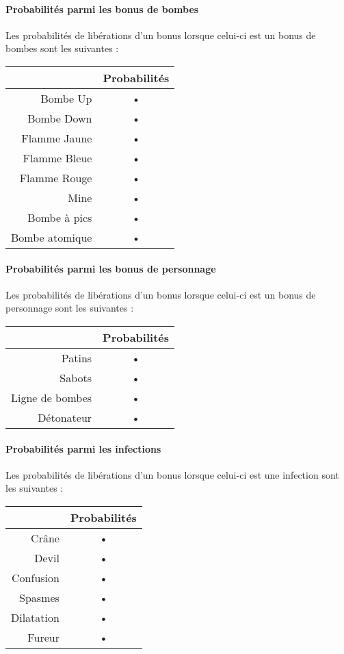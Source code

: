 \paragraph{Probabilités parmi les bonus de bombes}
Les probabilités de libérations d'un bonus lorsque celui-ci est un bonus de bombes sont les suivantes :
\begin{center}
\begin{tabular}{|r|c|}
\hline 
& Probabilités \\ 
\hline 
Bombe Up & • \\ 
\hline 
Bombe Down & • \\ 
\hline 
Flamme Jaune & • \\ 
\hline 
Flamme Bleue & • \\ 
\hline 
Flamme Rouge & • \\ 
\hline 
Mine & • \\ 
\hline 
Bombe à pics & • \\ 
\hline 
Bombe atomique & • \\ 
\hline 
\end{tabular} 
\end{center}

\paragraph{Probabilités parmi les bonus de personnage}
Les probabilités de libérations d'un bonus lorsque celui-ci est un bonus de personnage sont les suivantes :
\begin{center}
\begin{tabular}{|r|c|}
\hline 
& Probabilités \\ 
\hline 
Patins & • \\ 
\hline 
Sabots & • \\ 
\hline 
Ligne de bombes & • \\ 
\hline 
Détonateur & • \\ 
\hline 
\end{tabular} 
\end{center}

\paragraph{Probabilités parmi les infections}
Les probabilités de libérations d'un bonus lorsque celui-ci est une infection sont les suivantes :
\begin{center}
\begin{tabular}{|r|c|}
\hline 
& Probabilités \\ 
\hline 
Crâne & • \\ 
\hline 
Devil & • \\ 
\hline 
Confusion & • \\ 
\hline 
Spasmes & • \\ 
\hline 
Dilatation & • \\ 
\hline 
Fureur & • \\ 
\hline 
\end{tabular} 
\end{center}